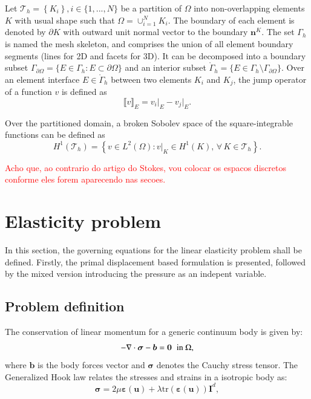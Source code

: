 \documentclass[english,11pt,3p,number,sort&compress]{elsarticle}
\newcommand{\jump}[1]
{
	\llbracket #1 \rrbracket
}
\begin{document}
Let $\mathcal{T}_h=\left\{K_i \right\}, i\in \{1,...,N\}$ be a partition of $\Omega$ into non-overlapping elements $K$ with usual shape such that $\Omega = \cup_{i=1}^{N} K_i$. The boundary of each element is denoted by $\partial K$ with outward unit normal vector to the boundary $\bm{n}^K$. The set $\Gamma_h$ is named the mesh skeleton, and comprises the union of all element boundary segments (lines for 2D and facets for 3D). It can be decomposed into a boundary subset $\Gamma_{\partial\Omega}=\{E \in \Gamma_h : E \subset \partial\Omega\}$ and an interior subset $\mathring{\Gamma}_h =\{E \in \Gamma_h \setminus \Gamma_{\partial\Omega}\}$. Over an element interface $E \in \mathring{\Gamma}_h$ between two elements $K_i$ and $K_j$, the jump operator of a function $v$ is defined as
\begin{equation*}
	\jump{v}_E = v_i \lvert_{E} - v_j \lvert_{E} \text{.}
\end{equation*}

Over the partitioned domain, a broken Sobolev space of the square-integrable functions can be defined as
\begin{equation*}
	H^1(\mathcal{T}_h) = \left\{v \in L^2(\Omega) : v \lvert_{K} \in H^1(K), \,\forall \, K\in\mathcal{T}_h \right\} \text{.}
\end{equation*}

\textcolor{red}{Acho que, ao contrario do artigo do Stokes, vou colocar os espacos discretos conforme eles forem aparecendo nas secoes.}

\section{Elasticity problem \label{sec:Governing-equations}}

In this section, the governing equations for the linear elasticity problem shall be defined. Firstly, the primal displacement based formulation is presented, followed by the mixed version introducing the pressure as an indepent variable.

\subsection{Problem definition}

The conservation of linear momentum for a generic continuum body is given by:
\begin{equation} \label{eq:momentum}
		-\nabla \cdot \bm{\sigma} - \bm{b} = \bm{0} \hspace{0.2cm} \text{in } \Omega ,
\end{equation}
\noindent where $\bm{b}$ is the body forces vector and $\bm{\sigma}$ denotes the Cauchy stress tensor. The Generalized Hook law relates the stresses and strains in a isotropic body as:
\begin{equation} \label{eq:hook}
    \bm{\sigma} = 2\mu \bm{\varepsilon}(\bm{u}) + \lambda \text{tr}(\bm{\varepsilon}(\bm{u})) \bm{I}^d ,
\end{equation}
\end{document}
